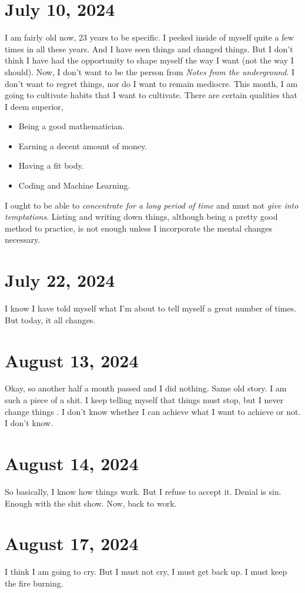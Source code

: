 \section{July 10, 2024}
\noindent I am fairly old now, 23 years to be specific. I peeked inside of myself quite a few times in all
these years. And I have seen things and changed things. But I don't think I have had the opportunity to
shape myself the way I want (not the way I should). Now, I don't want to be the person from \emph{Notes
from the underground}. I don't want to regret things, nor do I want to remain mediocre. This month, I am
going to cultivate habits that I want to cultivate. There are certain qualities that I deem superior,

\begin{itemize}
\itemsep0em
	\item Being a good mathematician.
	\item Earning a decent amount of money.
	\item Having a fit body.
	\item Coding and Machine Learning.
\end{itemize}

\noindent I ought to be able to \emph{concentrate for a long period of time} and must not \emph{give into
temptations}. Listing and writing down things, although being a pretty good method to practice, is not 
enough unless I incorporate the mental changes necessary.

\section{July 22, 2024}
\noindent I know I have told myself what I'm about to tell myself a great number of times. But today, it all
changes.

\section{August 13, 2024}
\noindent Okay, so another half a month passed and I did nothing. Same old story. I am such a piece of a shit.
I keep telling myself that things must stop, but I never change things . I don't know whether I can
achieve what I want to achieve or not. I don't know.

\section{August 14, 2024}
\noindent So basically, I know how things work. But I refuse to accept it. Denial is sin. Enough with the shit
show. Now, back to work.

\section{August 17, 2024}
\noindent I think I am going to cry. But I must not cry, I must get back up. I must keep the fire burning.


